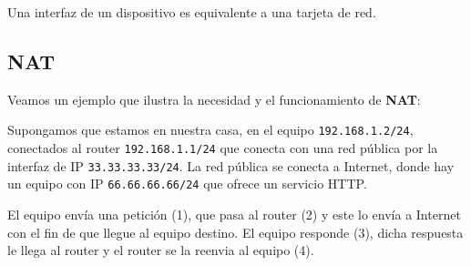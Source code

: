 \begin{observacion}
    Una interfaz de un dispositivo es equivalente a una tarjeta de red.
\end{observacion}



\subsection{\acrfull{NAT}}

Veamos un ejemplo que ilustra la necesidad y el funcionamiento de \textbf{\acrshort{NAT}\@}:

\begin{ejemplo}
    Supongamos que estamos en nuestra casa, en el equipo \verb|192.168.1.2/24|, conectados al router \verb|192.168.1.1/24| que conecta con una red pública por la interfaz de IP \verb|33.33.33.33/24|. La red pública se conecta a Internet, donde hay un equipo con IP \verb|66.66.66.66/24| que ofrece un servicio \acrshort{HTTP}\@.

    El equipo envía una petición (1), que pasa al router (2) y este lo envía a Internet con el fin de que llegue al equipo destino. El equipo responde (3), dicha respuesta le llega al router y el router se la reenvia al equipo  (4).
\end{ejemplo}

